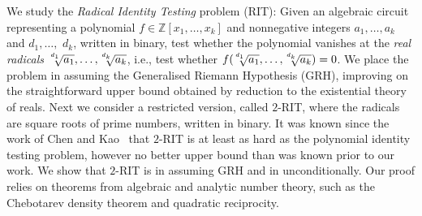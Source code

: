 We study the \emph{Radical Identity Testing} problem (RIT): Given an algebraic circuit representing a polynomial $f\in \mathbb{Z}[x_1, \dots, x_k]$ and nonnegative integers $a_1, \dots, a_k$ and $d_1, \dots,$ $d_k$, written in binary, test whether  the polynomial vanishes at the \emph{real radicals} $\mysqrt{d_1}{a_1}, \dots,\mysqrt{d_k}{a_k}$, i.e., test whether $f(\mysqrt{d_1}{a_1}, \dots, \mysqrt{d_k}{a_k}) = 0$. We place the problem in  {\coNP} assuming the Generalised Riemann Hypothesis (GRH), improving on the straightforward {\PSPACE} upper bound obtained by reduction to the existential theory of reals. Next we consider a restricted version, called $2$-RIT, where the radicals are square roots of prime numbers, written in binary. It was known since the work of Chen and Kao~\cite{chen-kao} that $2$-RIT is at least as hard as the polynomial identity testing problem, however no better upper bound than {\PSPACE} was known prior to our work. We show that $2$-RIT is in {\coRP} assuming GRH and in {\coNP} unconditionally. 
Our proof relies on theorems from algebraic and analytic number theory, such as the Chebotarev density theorem and quadratic reciprocity.





